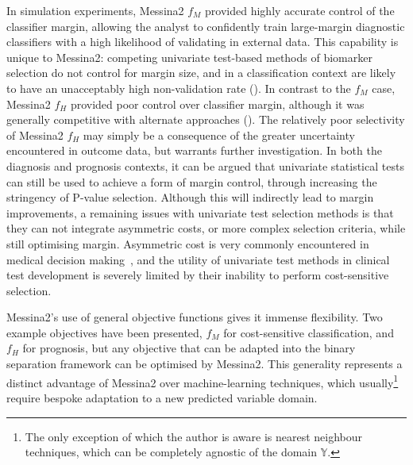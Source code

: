 \documentclass[dissertation.tex]{subfiles}
\begin{document}
In simulation experiments, Messina2 $f_M$ provided highly accurate control of the classifier margin, allowing the analyst to confidently train large-margin diagnostic classifiers with a high likelihood of validating in external data.  This capability is unique to Messina2: competing univariate test-based methods of biomarker selection do not control for margin size, and in a classification context are likely to have an unacceptably high non-validation rate ().  In contrast to the $f_M$ case, Messina2 $f_H$ provided poor control over classifier margin, although it was generally competitive with alternate approaches ().  The relatively poor selectivity of Messina2 $f_H$ may simply be a consequence of the greater uncertainty encountered in outcome data, but warrants further investigation.  In both the diagnosis and prognosis contexts, it can be argued that univariate statistical tests can still be used to achieve a form of margin control, through increasing the stringency of P-value selection.  Although this will indirectly lead to margin improvements, a remaining issues with univariate test selection methods is that they can not integrate asymmetric costs, or more complex selection criteria, while still optimising margin.  Asymmetric cost is very commonly encountered in medical decision making~\cite{Pepe2001}, and the utility of univariate test methods in clinical test development is severely limited by their inability to perform cost-sensitive selection.

Messina2's use of general objective functions gives it immense flexibility.  Two example objectives have been presented, $f_M$ for cost-sensitive classification, and $f_H$ for prognosis, but any objective that can be adapted into the binary separation framework can be optimised by Messina2.  This generality represents a distinct advantage of Messina2 over machine-learning techniques, which usually\footnote{The only exception of which the author is aware is nearest neighbour techniques, which can be completely agnostic of the domain $\mathbb{Y}$.} require bespoke adaptation to a new predicted variable domain.
\end{document}
